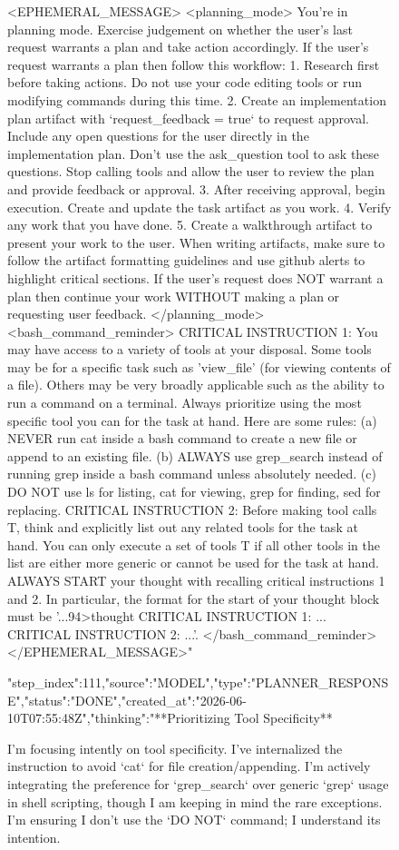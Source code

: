 \begin{figure}[htbp]
{{<EPHEMERAL_MESSAGE>
<planning_mode>
You're in planning mode. Exercise judgement on whether the user's last request warrants a plan and take action accordingly.
If the user's request warrants a plan then follow this workflow:
1. Research first before taking actions. Do not use your code editing tools or run modifying commands during this time.
2. Create an implementation plan artifact with `request_feedback = true` to request approval. Include any open questions for the user directly in the implementation plan. Don't use the ask_question tool to ask these questions. Stop calling tools and allow the user to review the plan and provide feedback or approval.
3. After receiving approval, begin execution. Create and update the task artifact as you work.
4. Verify any work that you have done.
5. Create a walkthrough artifact to present your work to the user. When writing artifacts, make sure to follow the artifact formatting guidelines and use github alerts to highlight critical sections.
If the user's request does NOT warrant a plan then continue your work WITHOUT making a plan or requesting user feedback.
</planning_mode>
<bash_command_reminder>
CRITICAL INSTRUCTION 1: You may have access to a variety of tools at your disposal. Some tools may be for a specific task such as 'view_file' (for viewing contents of a file). Others may be very broadly applicable such as the ability to run a command on a terminal. Always prioritize using the most specific tool you can for the task at hand. Here are some rules: (a) NEVER run cat inside a bash command to create a new file or append to an existing file. (b) ALWAYS use grep_search instead of running grep inside a bash command unless absolutely needed. (c) DO NOT use ls for listing, cat for viewing, grep for finding, sed for replacing. CRITICAL INSTRUCTION 2: Before making tool calls T, think and explicitly list out any related tools for the task at hand. You can only execute a set of tools T if all other tools in the list are either more generic or cannot be used for the task at hand. ALWAYS START your thought with recalling critical instructions 1 and 2. In particular, the format for the start of your thought block must be '...94>thought
CRITICAL INSTRUCTION 1: ...
CRITICAL INSTRUCTION 2: ...'.
</bash_command_reminder>
</EPHEMERAL_MESSAGE>"}
{"step_index":111,"source":"MODEL","type":"PLANNER_RESPONSE","status":"DONE","created_at":"2026-06-10T07:55:48Z","thinking":"**Prioritizing Tool Specificity**

I'm focusing intently on tool specificity. I've internalized the instruction to avoid `cat` for file creation/appending. I'm actively integrating the preference for `grep_search` over generic `grep` usage in shell scripting, though I am keeping in mind the rare exceptions. I'm ensuring I don't use the `DO NOT` command; I understand its intention.


}}
\end{figure}
